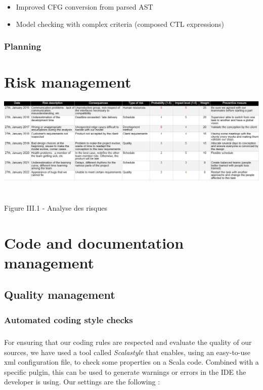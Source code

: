 \documentclass{report}
\begin{document}
\vspace{1.5mm}
\begin{itemize}
\item Improved CFG conversion from parsed AST\vspace{1mm}
\item Model checking with complex criteria (composed CTL expressions)\vspace{1mm}
\end{itemize}

\subsection{Planning}


\chapter{Risk management}

\begin{center}
\includegraphics[scale=0.5]{data/risks.png}
~\\~\\Figure III.1 - Analyse des risques
\end{center}

\chapter{Code and documentation management}

\section{Quality management}

\subsection{Automated coding style checks}

\paragraph{}
\hspace{4mm}For ensuring that our coding rules are respected and evaluate the quality of our sources, we have
used a tool called \textit{Scalastyle} that enables, using an easy-to-use xml configuration file, to check
some properties on a Scala code. Combined with a specific pulgin, this can be used to generate warnings or errors
in the IDE the developer is using. Our settings are the following :
\end{document}
